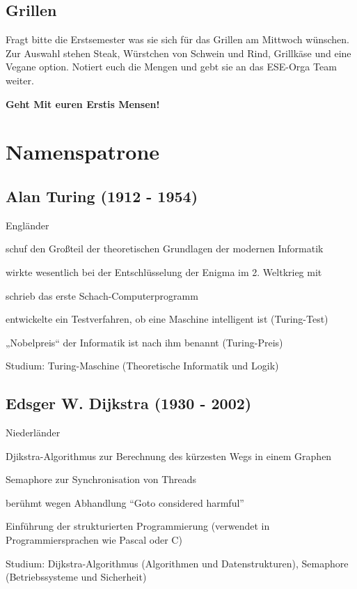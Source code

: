 \documentclass[a4paper,12pt]{report}
\begin{document}
\section{Grillen}

Fragt bitte die Erstsemester was sie sich für das Grillen am Mittwoch wünschen. Zur Auswahl stehen Steak, Würstchen von Schwein und Rind, Grillkäse und eine Vegane option. Notiert euch die Mengen und gebt sie an das ESE-Orga Team weiter.

\bigskip
\bigskip
\begin{center}
\huge{\textbf{Geht Mit euren Erstis Mensen!}}
\end{center}
\chapter{Namenspatrone}
\section*{Alan Turing (1912 - 1954)}
\begin{itemize*}
    \item Engländer
    \item schuf den Großteil der theoretischen Grundlagen der modernen Informatik
    \item wirkte wesentlich bei der Entschlüsselung der Enigma im 2. Weltkrieg mit
    \item schrieb das erste Schach-Computerprogramm
    \item entwickelte ein Testverfahren, ob eine Maschine intelligent ist (Turing-Test)
    \item „Nobelpreis“ der Informatik ist nach ihm benannt (Turing-Preis)
    \item Studium: Turing-Maschine (Theoretische Informatik und Logik)
\end{itemize*}

\section*{Edsger W. Dijkstra (1930 - 2002)}
\begin{itemize*}
    \item Niederländer
    \item Djikstra-Algorithmus zur Berechnung des kürzesten Wegs in einem Graphen
    \item Semaphore zur Synchronisation von Threads
    \item berühmt wegen Abhandlung ``Goto considered harmful''
    \item Einführung der strukturierten Programmierung (verwendet in Programmiersprachen wie
          Pascal oder C)
    \item Studium: Dijkstra-Algorithmus (Algorithmen und Datenstrukturen), Semaphore
          (Betriebssysteme und Sicherheit)
\end{itemize*}
\end{document}
